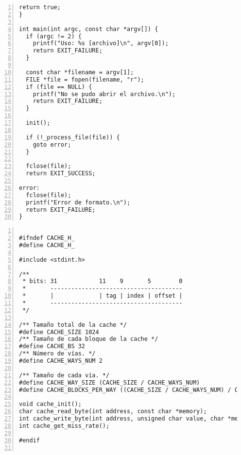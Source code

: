 \documentclass[11pt,a4paper, spanish]{article}
\begin{document}
\begin{lstlisting}[numbers=left, tabsize=2, basicstyle=\fontsize{11}{13}\ttfamily, frame=single, caption={makefile}]
  return true;
}

int main(int argc, const char *argv[]) {
  if (argc != 2) {
    printf("Uso: %s [archivo]\n", argv[0]);
    return EXIT_FAILURE;
  }

  const char *filename = argv[1];
  FILE *file = fopen(filename, "r");
  if (file == NULL) {
    printf("No se pudo abrir el archivo.\n");
    return EXIT_FAILURE;
  }

  init();

  if (!_process_file(file)) {
    goto error;
  }

  fclose(file);
  return EXIT_SUCCESS;

error:
  fclose(file);
  printf("Error de formato.\n");
  return EXIT_FAILURE;
}

\end{lstlisting}

\begin{lstlisting}[numbers=left, tabsize=2, basicstyle=\fontsize{11}{13}\ttfamily, frame=single, caption={makefile}]

#ifndef CACHE_H_
#define CACHE_H_

#include <stdint.h>

/**
 * bits: 31            11    9       5        0
 *       --------------------------------------
 *       |             | tag | index | offset |
 *       --------------------------------------
 */

/** Tamaño total de la cache */
#define CACHE_SIZE 1024
/** Tamaño de cada bloque de la cache */
#define CACHE_BS 32
/** Número de vías. */
#define CACHE_WAYS_NUM 2

/** Tamaño de cada vía. */
#define CACHE_WAY_SIZE (CACHE_SIZE / CACHE_WAYS_NUM)
#define CACHE_BLOCKS_PER_WAY ((CACHE_SIZE / CACHE_WAYS_NUM) / CACHE_BS)

void cache_init();
char cache_read_byte(int address, const char *memory);
int cache_write_byte(int address, unsigned char value, char *memory);
int cache_get_miss_rate();

#endif


\end{lstlisting}
\end{document}
